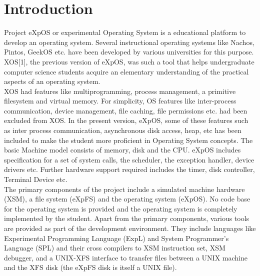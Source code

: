\chapter{Introduction}
\label{chap2}

Project eXpOS or experimental Operating System is a educational platform to develop an operating system. Several instructional operating systems like Nachos, Pintos, GeekOS etc. have been developed by various universities for this purpose.
XOS[1], the previous version of eXpOS, was such a tool that helps undergraduate computer science students acquire an elementary understanding of the practical aspects of an operating system.
\\

XOS had features like multiprogramming, process management, a primitive filesystem and virtual memory. For simplicity, OS features like inter-process communication, device management, file caching, file permissions etc. had been excluded from XOS. In the present version, eXpOS, some of these features such as inter process communication, asynchronous disk access, heap, etc has been included to make the student more proficient in Operating System concepts. The basic Machine model consists of memory, disk and the CPU. eXpOS includes specification for a set of system calls, the scheduler, the exception handler, device drivers etc.  Further hardware support required includes the timer, disk controller, Terminal Device etc.
\\

The primary components of the project include a simulated machine hardware (XSM), a file system (eXpFS) and the operating system (eXpOS). No code base for the operating system is provided and the operating system is completely implemented by the student. Apart from the primary components, various tools are provided as part of the development environment. They include languages like Experimental Programming Language (ExpL) and System Programmer's Language (SPL) and their cross compilers to XSM instruction set, XSM debugger, and a UNIX-XFS interface to transfer files between a UNIX machine and the XFS disk (the eXpFS disk is itself a UNIX file). 

